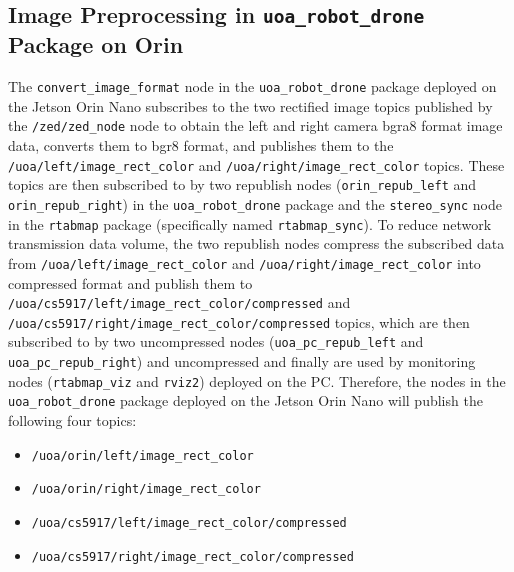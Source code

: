 \subsection{Image Preprocessing in \texttt{uoa\_robot\_drone} Package on Orin}
\sloppy
The \texttt{convert\_image\_format} node in the \texttt{uoa\_robot\_drone} package deployed on the Jetson Orin Nano subscribes to the two rectified image topics published by the \texttt{/zed/zed\_node} node to obtain the left and right camera bgra8 format image data, converts them to bgr8 format, and publishes them to the \texttt{/uoa/left/image\_rect\_color} and \texttt{/uoa/right/image\_rect\_color} topics. These topics are then subscribed to by two republish nodes (\texttt{orin\_repub\_left} and \texttt{orin\_repub\_right}) in the \texttt{uoa\_robot\_drone} package and the \texttt{stereo\_sync} node in the \texttt{rtabmap} package (specifically named \texttt{rtabmap\_sync}). To reduce network transmission data volume, the two republish nodes compress the subscribed data from \texttt{/uoa/left/image\_rect\_color} and \texttt{/uoa/right/image\_rect\_color} into compressed format and publish them to \texttt{/uoa/cs5917/left/image\_rect\_color/compressed} and \texttt{/uoa/cs5917/right/image\_rect\_color/compressed} topics, which are then subscribed to by two uncompressed nodes (\texttt{uoa\_pc\_repub\_left} and \texttt{uoa\_pc\_repub\_right}) and uncompressed and finally are used by monitoring nodes (\texttt{rtabmap\_viz} and \texttt{rviz2}) deployed on the PC. Therefore, the nodes in the \texttt{uoa\_robot\_drone} package deployed on the Jetson Orin Nano will publish the following four topics:
\begin{itemize}
    \item \texttt{/uoa/orin/left/image\_rect\_color}
    \item \texttt{/uoa/orin/right/image\_rect\_color}
    \item \texttt{/uoa/cs5917/left/image\_rect\_color/compressed}
    \item \texttt{/uoa/cs5917/right/image\_rect\_color/compressed}
\end{itemize}

